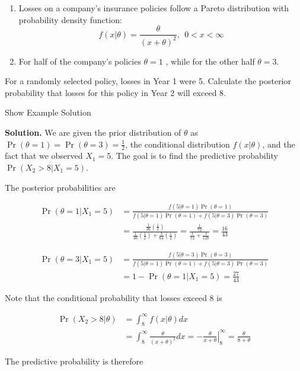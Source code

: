 \documentclass[]{book}
\providecommand{\tightlist}{%
  \setlength{\itemsep}{0pt}\setlength{\parskip}{0pt}}
\theoremstyle{definition}
\theoremstyle{definition}
\theoremstyle{definition}
\theoremstyle{remark}
\begin{document}
\begin{enumerate}
\def\labelenumi{(\roman{enumi})}
\tightlist
\item
  Losses on a company's insurance policies follow a Pareto distribution
  with probability density function: \[
  f(x|\theta) = \frac{\theta}{(x+\theta)^2}, \ \ 0 < x < \infty
  \]
\item
  For half of the company's policies \(\theta=1\) , while for the other
  half \(\theta=3\).
\end{enumerate}

For a randomly selected policy, losses in Year 1 were 5. Calculate the
posterior probability that losses for this policy in Year 2 will exceed
8.

Show Example Solution

\hypertarget{toggleExampleSelect.4.4}{}
\textbf{Solution.} We are given the prior distribution of \(\theta\) as
\(\Pr(\theta=1)=\Pr(\theta=3)=\frac{1}{2}\), the conditional
distribution \(f(x|\theta)\), and the fact that we observed \(X_1=5\).
The goal is to find the predictive probability \(\Pr(X_2>8|X_1=5)\).

The posterior probabilities are

\[
\begin{aligned}
\Pr(\theta=1|X_1=5) &= \frac{f(5|\theta=1)\Pr(\theta=1)}{f(5|\theta=1)\Pr(\theta=1) + f(5|\theta=3)\Pr(\theta=3)} \\
&= \frac{\frac{1}{36}(\frac{1}{2})}{\frac{1}{36}(\frac{1}{2})+\frac{3}{64}(\frac{1}{2})} = \frac{\frac{1}{72}}{\frac{1}{72} + \frac{3}{128}} = \frac{16}{43}
\end{aligned}
\]

\[
\begin{aligned}
\Pr(\theta=3|X_1=5) &= \frac{f(5|\theta=3)\Pr(\theta=3)}{f(5|\theta=1)\Pr(\theta=1) + f(5|\theta=3)\Pr(\theta=3)} \\
&= 1-\Pr(\theta=1|X_1=5) = \frac{27}{43}
\end{aligned}
\]

Note that the conditional probability that losses exceed 8 is

\[
\begin{aligned}
\Pr(X_2>8|\theta) &= \int_8^\infty f(x|\theta)dx \\
&= \int_8^\infty \frac{\theta}{(x+\theta)^2}dx = \left. -\frac{\theta}{x+\theta} \right|_8^\infty = \frac{\theta}{8 + \theta}
\end{aligned}
\]

The predictive probability is therefore
\end{document}

